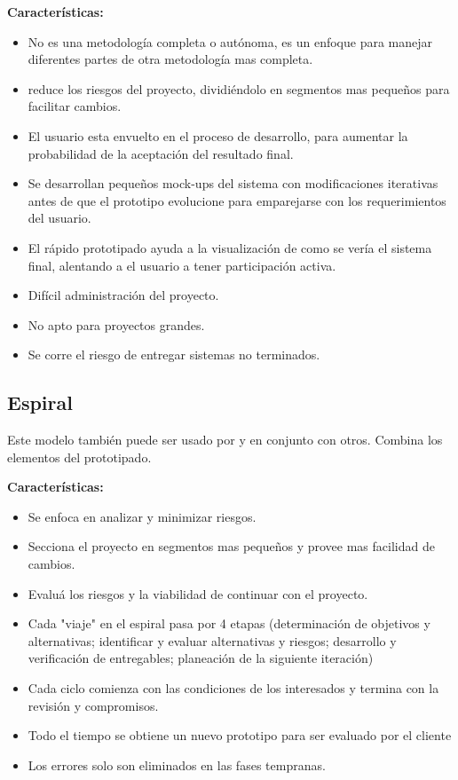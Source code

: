 \documentclass[spanish,12pt,letterpapper]{article}
\begin{document}
	\textbf{Características:}
	\begin{itemize}
	\item No es una metodología completa o autónoma, es un enfoque para manejar diferentes partes de otra metodología mas completa.
	\item reduce los riesgos del proyecto, dividiéndolo en segmentos mas pequeños para facilitar cambios.
	\item El usuario esta envuelto en el proceso de desarrollo, para aumentar la probabilidad de la aceptación del resultado final.
	\item Se desarrollan pequeños mock-ups del sistema con modificaciones iterativas antes de que el prototipo evolucione para emparejarse con los requerimientos del usuario.
	\item El rápido prototipado ayuda a la visualización de como se vería el sistema final, alentando a el usuario a tener participación activa.
	\item Difícil administración del proyecto. 
	\item No apto para proyectos grandes.
	\item Se corre el riesgo de entregar sistemas no terminados.
	\end{itemize}
	
	\subsection{Espiral}
	Este modelo también puede ser usado por y en conjunto con otros. Combina los elementos del prototipado.
	
	\textbf{Características:}
	\begin{itemize}
	\item Se enfoca en analizar y minimizar riesgos.
	\item Secciona el proyecto en segmentos mas pequeños y provee mas facilidad de cambios.
	\item Evaluá los riesgos y la viabilidad de continuar con el proyecto.
	\item Cada "viaje" en el espiral pasa por 4 etapas (determinación de objetivos y alternativas; identificar y evaluar alternativas y riesgos; desarrollo y verificación de entregables; planeación de la siguiente iteración)
	\item Cada ciclo comienza con las condiciones de los interesados y termina con la revisión y compromisos.
	\item Todo el tiempo se obtiene un nuevo prototipo para ser evaluado por el cliente
	\item Los errores solo son eliminados en las fases tempranas.
	\end{itemize}
	
\end{document}
